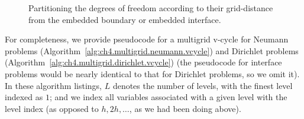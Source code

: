 \setlength{\figureheight}{0.40\columnwidth}
\begin{figure}[htbp]
\begin{center}
\caption{Partitioning the degrees of freedom according to their grid-distance from the embedded boundary or embedded interface.}
\label{fig:ch4.multigrid.boundaryinterfacedistance}
\end{center}
\end{figure}

For completeness, we provide pseudocode for a multigrid v-cycle for Neumann problems (Algorithm~\ref{alg:ch4.multigrid.neumann.vcycle}) and Dirichlet problems (Algorithm~\ref{alg:ch4.multigrid.dirichlet.vcycle}) (the pseudocode for interface problems would be nearly identical to that for Dirichlet problems, so we omit it). In these algorithm listings, $L$ denotes the number of levels, with the finest level indexed as $1$; and we index all variables associated with a given level with the level index (as opposed to $h, 2h, \dotsc$, as we had been doing above).


